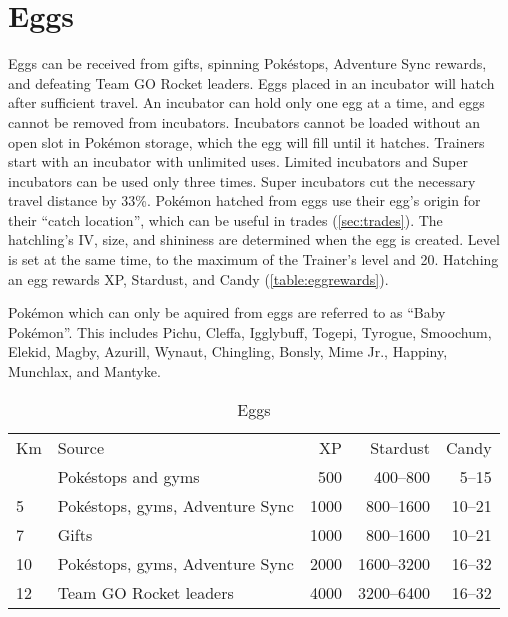 \section{Eggs\label{sec:eggs}}
Eggs can be received from gifts, spinning Pokéstops, Adventure Sync rewards,
  and defeating Team GO Rocket leaders.
Eggs placed in an incubator will hatch after sufficient travel.
An incubator can hold only one egg at a time, and eggs cannot be removed from incubators.
Incubators cannot be loaded without an open slot in Pokémon storage, which the egg will fill
 until it hatches.
Trainers start with an incubator with unlimited uses.
Limited incubators and Super incubators can be used only three times.
Super incubators cut the necessary travel distance by 33\%.
Pokémon hatched from eggs use their egg's origin for their ``catch location'',
 which can be useful in trades (\autoref{sec:trades}).
The hatchling's IV, size, and shininess are determined when the egg is created.
Level is set at the same time, to the maximum of the Trainer's level and 20.
Hatching an egg rewards XP, Stardust, and Candy (\autoref{table:eggrewards}).
\begin{tipbox}[title=Baby Pokémon]
Pokémon which can only be aquired from eggs are referred to as ``Baby Pokémon''.
This includes Pichu, Cleffa, Igglybuff, Togepi, Tyrogue, Smoochum, Elekid, Magby,
 Azurill, Wynaut, Chingling, Bonsly, Mime Jr., Happiny, Munchlax, and Mantyke.
\end{tipbox}
\begin{table}
\centering
\begin{tabular}{llrrr}
Km & Source & XP & Stardust & Candy\\
\Midrule
  2 & Pokéstops and gyms & 500 & 400--800 & 5--15\\
  5 & Pokéstops, gyms, Adventure Sync & 1000 & 800--1600 & 10--21\\
  7 & Gifts & 1000 & 800--1600 & 10--21\\
  10 & Pokéstops, gyms, Adventure Sync & 2000 & 1600--3200 & 16--32\\
  12 & Team GO Rocket leaders & 4000 & 3200--6400 & 16--32\\
\end{tabular}
  \caption{Eggs\label{table:eggrewards}}
\end{table}

